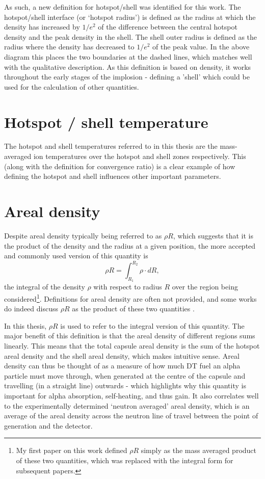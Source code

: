 As such, a new definition for hotspot/shell was identified for this work. The hotspot/shell interface (or `hotspot radius') is defined as the radius at which the density has increased by $1/e^2$ of the difference between the central hotspot density and the peak density in the shell. The shell outer radius is defined as the radius where the density has decreased to $1/e^2$ of the peak value. In the above diagram this places the two boundaries at the dashed lines, which matches well with the qualitative description. As this definition is based on density, it works throughout the early stages of the implosion - defining a 'shell' which could be used for the calculation of other quantities. 

\section{Hotspot / shell temperature}
The hotspot and shell temperatures referred to in this thesis are the mass-averaged ion temperatures over the hotspot and shell zones respectively. This (along with the definition for convergence ratio) is a clear example of how defining the hotspot and shell influences other important parameters.

\section{Areal density}

Despite areal density typically being referred to as $\rho R$, which suggests that it is the product of the density and the radius at a given position, the more accepted and commonly used version \cite{Craxton2005, Betti2005, Abu-Shawareb2022} of this quantity is \begin{equation} \rho R = \int_{R_1}^{R_2} \rho \cdot dR, \end{equation} the integral of the density $\rho$ with respect to radius $R$ over the region being considered\footnote{My first paper on this work defined $\rho R$ simply as the mass averaged product of these two quantities, which was replaced with the integral form for subsequent papers.}. Definitions for areal density are often not provided, and some works do indeed discuss $\rho R$ as the product of these two quantities \cite{Atzeni2008}.

In this thesis, $\rho R$ is used to refer to the integral version of this quantity. The major benefit of this definition is that the areal density of different regions sums linearly. This means that the total capsule areal density is the sum of the hotspot areal density and the shell areal density, which makes intuitive sense. Areal density can thus be thought of as a measure of how much DT fuel an alpha particle must move through, when generated at the centre of the capsule and travelling (in a straight line) outwards - which highlights why this quantity is important for alpha absorption, self-heating, and thus gain. It also correlates well to the experimentally determined `neutron averaged' areal density, which is an average of the areal density across the neutron line of travel between the point of generation and the detector.


